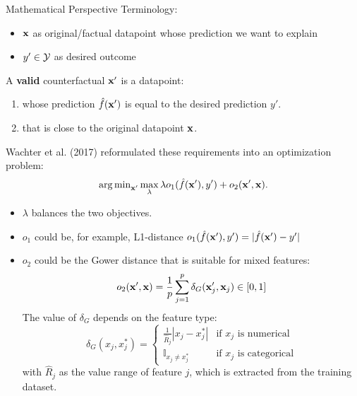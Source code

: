 \documentclass[11pt,compress,t,notes=noshow, xcolor=table]{beamer}
\begin{document}
\begin{vbframe}{Mathematical Perspective}
	Terminology: 
	\begin{itemize}
		\item $\xv$ as original/factual datapoint whose prediction we want to explain
		\item $y' \in \Yspace$ as desired outcome 
	\end{itemize}
	\vspace{0.3cm}
	A \textbf{valid} counterfactual $\xv'$ is a datapoint: 
	\begin{enumerate}
		\item whose prediction $\fh(\xv')$ is equal to the desired prediction $y'$. 
		\item that is close to the original datapoint $\xv$.
	\end{enumerate}
	Wachter et al. (2017) reformulated these requirements into an optimization problem: 
	\begin{equation}
		\argmin_{\xv'} \max_{\lambda} \lambda o_1(\fh(\xv'), y') + o_2(\xv', \xv).
		\label{eq:wachter}
	\end{equation}
	\begin{itemize}
		\item $\lambda$ balances the two objectives.
		\item $o_1$ could be, for example, L1-distance $o_1(\fh(\xv'), y') = |\fh(\xv')-y'|$
		\item $o_2$ could be the Gower distance that is suitable for mixed features: 
		$$o_2(\xv', \xv) = \frac{1}{p}\sum_{j = 1}^{p} \delta_G(\xv'_j, \xv_j)\in [0, 1]$$
		The value of $\delta_G$ depends on the feature type:
		\begin{equation*}
		\delta_G(x_j, x^*_j) = 
		\begin{cases}
		\frac{1}{\widehat{R}_j}|x_j- x^*_j| & \text{if $x_j$ is numerical} \\
		\mathbb{I}_{x_j \neq x_j^*} & \text{if $x_j$ is categorical}
		\end{cases}
		\end{equation*}
		with $\widehat{R}_j$ as the value range of feature $j$, which is extracted from the training dataset. 
	\end{itemize}
\end{vbframe}
\end{document}
